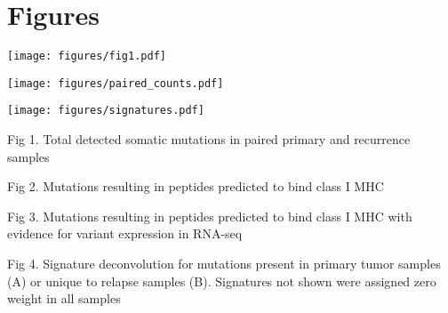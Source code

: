 \section{Figures}
\texttt{[image: figures/fig1.pdf]}

\texttt{[image: figures/paired\_counts.pdf]}

\texttt{[image: figures/signatures.pdf]}


Fig 1. Total detected somatic mutations in paired primary and recurrence samples

Fig 2. Mutations resulting in peptides predicted to bind class I MHC

Fig 3. Mutations resulting in peptides predicted to bind class I MHC with evidence for variant expression in RNA-seq

Fig 4. Signature deconvolution for mutations present in primary tumor samples (A) or unique to relapse samples (B). Signatures not shown were assigned zero weight in all samples
